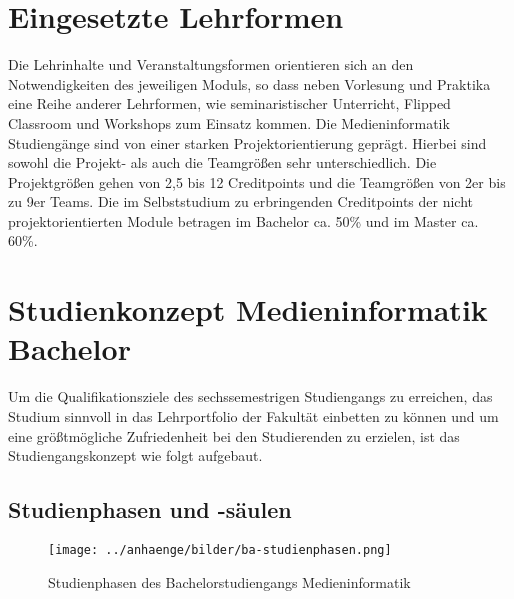 \section{Eingesetzte
Lehrformen\label{/mi-2017/selbstbericht/0400-studiengangskonzept/0000-studiengangskonzept}}\label{eingesetzte-lehrformenpathlabelmi-2017selbstbericht0400-studiengangskonzept0000-studiengangskonzept}

Die Lehrinhalte und Veranstaltungsformen orientieren sich an den
Notwendigkeiten des jeweiligen Moduls, so dass neben Vorlesung und
Praktika eine Reihe anderer Lehrformen, wie seminaristischer Unterricht,
Flipped Classroom und Workshops zum Einsatz kommen. Die Medieninformatik
Studiengänge sind von einer starken Projektorientierung geprägt. Hierbei
sind sowohl die Projekt- als auch die Teamgrößen sehr unterschiedlich.
Die Projektgrößen gehen von 2,5 bis 12 Creditpoints und die Teamgrößen
von 2er bis zu 9er Teams. Die im Selbststudium zu erbringenden
Creditpoints der nicht projektorientierten Module betragen im Bachelor
ca. 50\% und im Master ca. 60\%.

\section{Studienkonzept Medieninformatik
Bachelor\label{/mi-2017/selbstbericht/0400-studiengangskonzept/0000-studiengangskonzept}}\label{studienkonzept-medieninformatik-bachelorpathlabelmi-2017selbstbericht0400-studiengangskonzept0000-studiengangskonzept}

Um die Qualifikationsziele des sechssemestrigen Studiengangs zu
erreichen, das Studium sinnvoll in das Lehrportfolio der Fakultät
einbetten zu können und um eine größtmögliche Zufriedenheit bei den
Studierenden zu erzielen, ist das Studiengangskonzept wie folgt
aufgebaut.

\subsection{Studienphasen und
-säulen\label{/mi-2017/selbstbericht/0400-studiengangskonzept/0000-studiengangskonzept}}\label{studienphasen-und--suxe4ulenpathlabelmi-2017selbstbericht0400-studiengangskonzept0000-studiengangskonzept}

\begin{figure}[htbp]
\centering
\texttt{[image: ../anhaenge/bilder/ba-studienphasen.png]}
\caption{Studienphasen des Bachelorstudiengangs Medieninformatik}
\end{figure}

